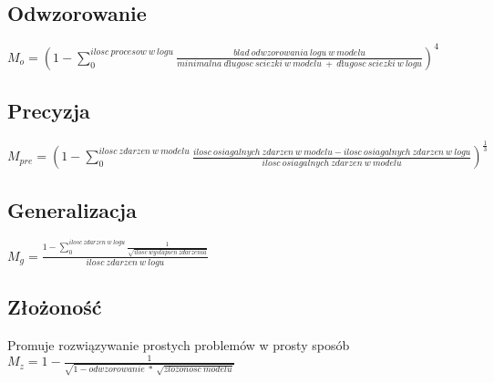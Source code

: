 \subsection{Odwzorowanie}
$M_o = (1 - \sum_{0}^{ilosc\ procesow\ w\ logu} \frac{blad\ odwzorowania\ logu\ w\ modelu}{minimalna\ długosc\ sciezki\ w\ modelu\ +\ długosc\ sciezki\ w\ logu})^4$
\subsection{Precyzja}
$M_{pre} = (1 - \sum_{0}^{ilosc\ zdarzen\ w\ modelu} \frac{ilosc\ osiagalnych\ zdarzen\ w\ modelu - ilosc\ osiagalnych\ zdarzen\ w\ logu}{ilosc\ osiagalnych\ zdarzen\ w\ modelu})^{\frac{1}{3}} $
\subsection{Generalizacja}
$M_g = \frac{1 - \sum_{0}^{ilosc\ zdarzen\ w\ logu} \frac{1}{\sqrt{ilosc\ wystapien\ zdarzenia}}}{ilosc\ zdarzen\ w\ logu} $
\subsection{Złożoność}
Promuje rozwiązywanie prostych problemów w prosty sposób 
$M_z = 1 - \frac{1}{\sqrt{1 - odwzorowanie\ *\ \sqrt{zlozonosc\ modelu}}} $
